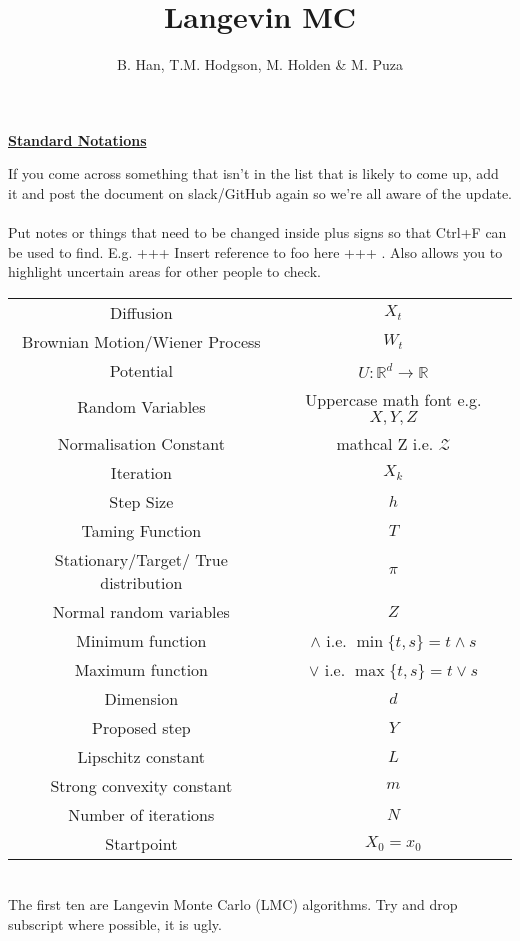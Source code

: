 \documentclass[a4paper]{article}
\title{Langevin MC}
\author{B. Han, T.M. Hodgson, M. Holden \& M. Puza}
\theoremstyle{definition}
\newcommand{\R}{\mathbb{R}}
\begin{document}
	\begin{center}
		{\huge \underline{\textbf{Standard Notations}}}
	\end{center}
If you come across something that isn't in the list that is likely to come up, add it and post the document on slack/GitHub again so we're all aware of the update.\\
\\
Put notes or things that need to be changed inside plus signs so that Ctrl+F can be used to find. E.g. +++ Insert reference to foo here +++ . Also allows you to highlight uncertain areas for other people to check.\\

\begin{center}
	\begin{tabular}{cc}
		Diffusion & \(X_t\) \\
		Brownian Motion/Wiener Process & \(W_t\)\\
		Potential & \( U:\R^d \to  \R \) \\
		Random Variables & Uppercase math font e.g. \(X,Y,Z\) \\
		Normalisation Constant & mathcal Z i.e. \(\mathcal{Z}\)\\
		Iteration & \(X_k\) \\ 
		Step Size & \(h\) \\ 
		Taming Function & \(T\) \\ 
		Stationary/Target/ True distribution & \(\pi\) \\ 
		Normal random variables & \(Z\) \\ 
		Minimum function & \(\wedge\)   i.e. \(\min\lbrace t,s\rbrace = t\wedge s\) \\
		Maximum function & \(\vee\)   i.e. \(\max\lbrace t,s\rbrace = t\vee s\) \\  
		Dimension & \(d\) \\ 
		Proposed step & \(Y\) \\ 
		Lipschitz constant & \(L\) \\ 
		Strong convexity constant & \(m\) \\ 
		Number of iterations & \(N\) \\ 
		Startpoint  & \(X_0 = x_0\) \\ 
	\end{tabular} \\
\vspace{1cm}
The first ten are Langevin Monte Carlo (LMC) algorithms. Try and drop subscript where possible, it is ugly.\\
\vspace{1cm}
\end{center}
\end{document}

